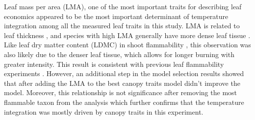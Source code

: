 \documentclass{ttuthes2007}
\begin{document}




Leaf mass per area (LMA), one of the most important traits for describing leaf economics %
\citep{wright2004worldwide} appeared to be the most important determinant of temperature integration among all the measured leaf traits in this study. LMA is related to leaf thickness \citep{niinemets1999research}, and species with high LMA generally have more dense leaf tissue \citep{poorter2009causes}. Like leaf dry matter content (LDMC) in shoot flammability \citep{alam2020shoot, potts2022growth}, this observation
was also likely due to the denser leaf tissue, which allows for longer burning with greater intensity. This result is consistent with previous leaf flammability experiments \citep{krix2018landscape}.
However, an additional step in the model selection results showed that after adding the LMA to the best canopy traits model didn't improve the model.
Moreover, this relationship is not significance %
after removing the most flammable taxon from the analysis which further confirms that the temperature integration was mostly driven by canopy traits in this experiment.\\
\end{document}
